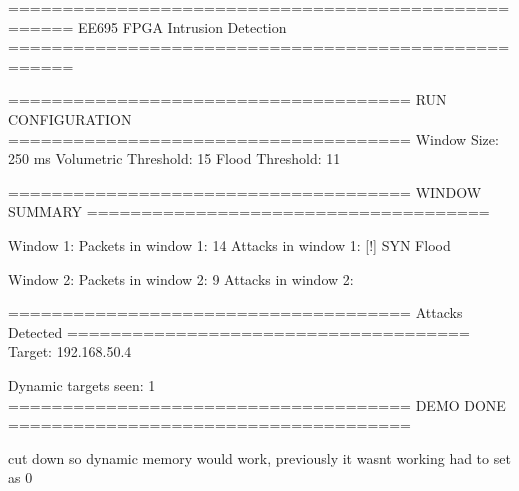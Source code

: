 ====================================================
        EE695 FPGA Intrusion Detection 
====================================================


=====================================
RUN CONFIGURATION
=====================================
Window Size: 250 ms
Volumetric Threshold: 15
Flood Threshold: 11


=====================================
WINDOW SUMMARY
=====================================

Window 1:
Packets in window 1: 14
Attacks in window 1:
  [!] SYN Flood

Window 2:
Packets in window 2: 9
Attacks in window 2:


=====================================
Attacks Detected
=====================================
Target: 192.168.50.4

Dynamic targets seen: 1
=====================================
             DEMO DONE
=====================================



cut down so dynamic memory would work, previously it wasnt working had to set as 0